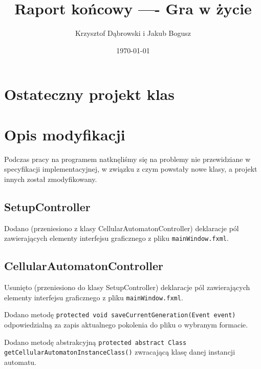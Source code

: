 \documentclass{mwart}
\title{Raport końcowy ---- Gra w życie}
\author{Krzysztof Dąbrowski i Jakub Bogusz}
\date{\today}
\begin{document}
\maketitle{}

\tableofcontents{}

\section{Ostateczny projekt klas}

\section{Opis modyfikacji}
Podczas pracy na programem natknęliśmy się na problemy nie przewidziane w specyfikacji implementacyjnej, w związku z czym powstały nowe klasy, a projekt innych został zmodyfikowany.

\subsection{SetupController}
Dodano (przeniesiono z klasy CellularAutomatonController) deklaracje pól zawierających elementy interfejsu graficznego z pliku \texttt{mainWindow.fxml}.

\subsection{CellularAutomatonController}
Usunięto (przeniesiono do klasy SetupController) deklaracje pól zawierających elementy interfejsu graficznego z pliku \texttt{mainWindow.fxml}.

Dodano metodę \texttt{protected void saveCurrentGeneration(Event event)} odpowiedzialną za zapis aktualnego pokolenia do pliku o wybranym formacie.

Dodano metodę abstrakcyjną \texttt{protected abstract Class getCellularAutomatonInstanceClass()} zwracającą klasę danej instancji automatu.\\
\end{document}
